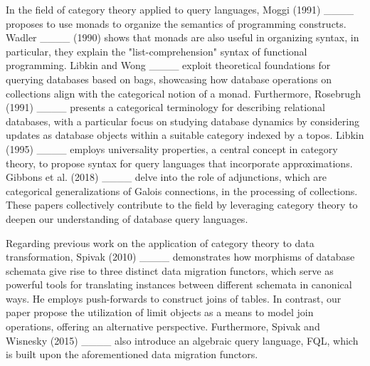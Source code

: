 In the field of category theory applied to query languages, Moggi (1991) ____ proposes to use monads to organize the semantics of programming constructs. Wadler ____ (1990) shows that monads are also useful in organizing syntax, in particular, they explain the
"list-comprehension" syntax of functional programming. Libkin and Wong ____ exploit theoretical foundations for querying databases based on bags, showcasing how database operations on collections align with the categorical notion of a monad. Furthermore, Rosebrugh (1991) ____ presents a categorical terminology for describing relational databases, with a particular focus on studying database dynamics by considering updates as database objects within a suitable category indexed by a topos. Libkin (1995) ____ employs universality properties, a central concept in category theory, to propose syntax for query languages that incorporate approximations.  Gibbons et al. (2018) ____ delve into the role of adjunctions, which are categorical generalizations of Galois connections, in the processing of collections. These papers collectively contribute to the field by leveraging category theory to  deepen our understanding of database query languages.



Regarding previous work on the application of category theory to data transformation,  Spivak (2010) ____ demonstrates how morphisms of database schemata give rise to three distinct data migration functors, which serve as powerful tools for translating instances between different schemata in canonical ways. He employs push-forwards to construct joins of tables. In contrast, our paper propose the utilization of limit objects as a means to model join operations, offering an alternative perspective. Furthermore, Spivak and Wisnesky (2015) ____  also introduce an algebraic query language, FQL, which is built upon the aforementioned data migration functors.


 

